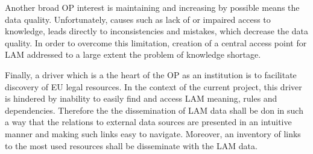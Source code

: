 	Another broad OP interest is maintaining and increasing by possible means the data quality. Unfortunately, causes such as lack of or impaired access to knowledge, leads directly to inconsistencies and mistakes, which decrease the data quality. In order to overcome this limitation, creation of a central access point for LAM addressed to a large extent the problem of knowledge shortage. 
	
	Finally, a driver which is a the heart of the OP as an institution is to facilitate discovery of EU legal resources. In the context of the current project, this driver is hindered by inability to easily find and access LAM meaning, rules and dependencies. Therefore the the dissemination of LAM data shall be don in such a way that the relations to external data sources are presented in an intuitive manner and making such links easy to navigate. Moreover, an inventory of links to the most used resources shall be disseminate with the LAM data. 
	
	
	